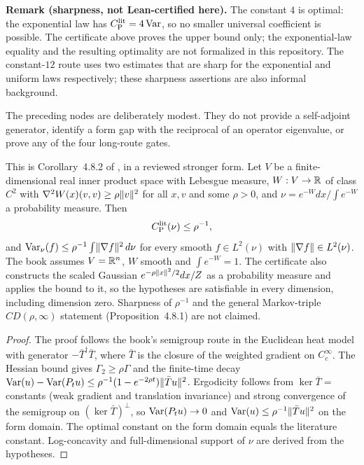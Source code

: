 \noindent\textbf{Remark (sharpness, not Lean-certified here).}
The constant $4$ is optimal: the exponential law has $C_{\mathrm P}^{\mathrm{lit}}=4\operatorname{Var}$, so no smaller universal
coefficient is possible.  The certificate above proves the upper bound only; the exponential-law
equality and the resulting optimality are not formalized in this repository.  The constant-$12$
route uses two estimates that are sharp for the exponential and uniform laws respectively;
these sharpness assertions are also informal background.

The preceding nodes are deliberately modest.  They do not provide a self-adjoint generator, identify a
form gap with the reciprocal of an operator eigenvalue, or prove any of the four long-route gates.

\begin{theorem}
  \label{thm:bakry-emery-poincare}
  \leanok
  This is Corollary~4.8.2 of \cite{BakryGentilLedoux2014}, in a reviewed stronger form.  Let $V$
  be a finite-dimensional real inner product space with Lebesgue measure, $W:V\to\mathbb{R}$ of class
  $C^2$ with $\nabla^2W(x)(v,v)\ge\rho\lVert v\rVert^2$ for all $x,v$ and some $\rho>0$, and
  $\nu=e^{-W}dx/\int e^{-W}$ a probability measure.  Then
  \[
    C_{\mathrm P}^{\mathrm{lit}}(\nu)\le\rho^{-1},
  \]
  and $\operatorname{Var}_\nu(f)\le\rho^{-1}\int\lVert\nabla f\rVert^2\,d\nu$ for every smooth $f\in L^2(\nu)$ with
  $\lVert\nabla f\rVert\in L^2(\nu)$.  The book assumes $V=\mathbb{R}^n$, $W$ smooth and $\int e^{-W}=1$.
  The certificate also constructs the scaled Gaussian $e^{-\rho\lVert x\rVert^2/2}dx/Z$ as a probability
  measure and applies the bound to it, so the hypotheses are satisfiable in every dimension,
  including dimension zero.  Sharpness of $\rho^{-1}$ and the general Markov-triple
  $CD(\rho,\infty)$ statement (Proposition~4.8.1) are not claimed.
\end{theorem}
\begin{proof}
  \leanok
  The proof follows the book's semigroup route in the Euclidean heat model with generator
  $-\bar T^\dagger\bar T$, where $\bar T$ is the closure of the weighted gradient on $C_c^\infty$.
  The Hessian bound gives $\Gamma_2\ge\rho\Gamma$ and the finite-time decay
  $\operatorname{Var}(u)-\operatorname{Var}(P_tu)\le\rho^{-1}(1-e^{-2\rho t})\lVert\bar Tu\rVert^2$.  Ergodicity follows from
  $\ker\bar T=$ constants (weak gradient and translation invariance) and strong convergence of
  the semigroup on $(\ker\bar T)^\perp$, so $\operatorname{Var}(P_tu)\to0$ and $\operatorname{Var}(u)\le\rho^{-1}\lVert\bar Tu\rVert^2$
  on the form domain.  The optimal constant on the form domain equals the literature constant.
  Log-concavity and full-dimensional support of $\nu$ are derived from the hypotheses.
\end{proof}


